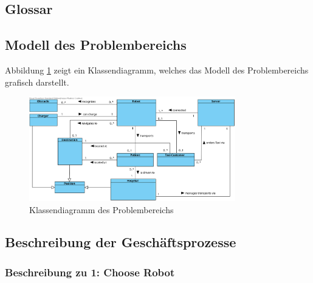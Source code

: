 \pagebreak

		\subsection{Glossar}


		
		
		
		\subsection{Modell des Problembereichs}
		Abbildung \ref{fig:2-3-modell-problembereich} zeigt ein Klassendiagramm, welches das Modell des Problembereichs grafisch darstellt.
		\begin{figure}[H]
			\centering
			\includegraphics[width=0.8\textwidth]{img/1-Analyse-2}
			\caption{Klassendiagramm des Problembereichs}
			\label{fig:2-3-modell-problembereich}
		\end{figure}

		\subsection{Beschreibung der Geschäftsprozesse}

			\subsubsection{Beschreibung zu 1: Choose Robot}

